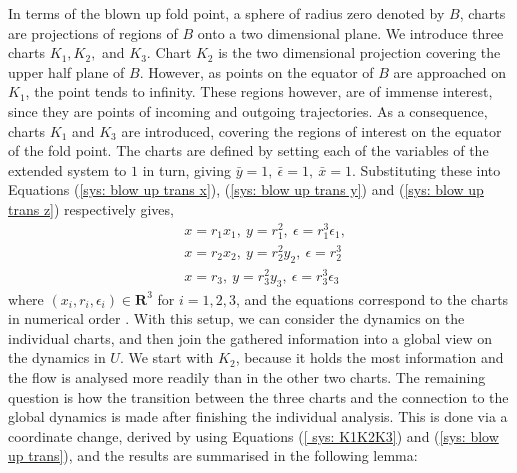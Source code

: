 In terms of the blown up fold point, a sphere of radius zero denoted by $B$, charts are projections of regions of $B$ onto a two dimensional plane. We introduce three charts $ K_1,K_2,$ and $K_3 $. Chart $K_2$ is the two dimensional projection covering the upper half plane of $B$. However, as points on the equator of $B$ are approached on $K_1$, the point tends to infinity. These regions however, are of immense interest, since they are points of incoming and outgoing trajectories. As a consequence, charts $K_1$ and $K_3$ are introduced, covering the regions of interest on the equator of the fold point. 
The charts are defined by setting each of the variables of the extended system to $1$ in turn, giving $ \bar{y}=1, \ \bar{\epsilon}=1, \ \bar{x}=1 $. Substituting these into Equations (\ref{sys: blow up trans x}), (\ref{sys: blow up trans y}) and (\ref{sys: blow up trans z}) respectively gives, 
\begin{subequations} \label{ sys: K1K2K3}
	\begin{align}
	&x=r_1x_1, \ y=r_1^2, \ \epsilon=r_1^3\epsilon_1, \label{sys: K1}\\
	&x=r_2x_2, \ y=r_2^2y_2, \ \epsilon=r_2^3 \label{sys: K2}\\
	&x=r_3, \ y=r_3^2y_3, \ \epsilon=r_3^3\epsilon_3\label{sys:K3}
	\end{align}
\end{subequations}
where $ (x_i,r_i,\epsilon_i)\in\mathbf{R}^3 $ for $ i=1,2,3 $, and the equations correspond to the charts in numerical order \citep{krupa2001}. 
With this setup, we can consider the dynamics on the individual charts, and then join the gathered information into a global view on the dynamics in $U$. We start with $K_2$,  because it holds the most information and the flow is analysed more readily than in the other two charts. The remaining question is how the transition between the three charts and the connection to the global dynamics is made after finishing the individual analysis. This is done via a coordinate change, derived by using Equations (\ref{ sys: K1K2K3}) and (\ref{sys: blow up trans}), and the results are summarised in the following lemma:
